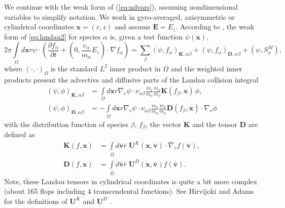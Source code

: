 \documentclass[12pt]{siamart}
\begin{document}
We continue with the weak form of (\ref{eq:ndvars}), assuming nondimensional variables to simplify notation.
We work in gyro-averaged, axisymmetric or cylindrical coordinates $\bm{x} = \left ( r, z \right )$ and assume ${\bm E = E_{z}}$.
According to \cite{Hirvijoki2016,AdamsHirvijokiKnepleyBrownIsaacMills2017}, the weak form of \ref{eq:landau2} for species $\alpha$ is, given a test function $\psi(\bm{x})$,  
\begin{equation}
\label{eq:weak-form}
2\pi \int \limits_{\Omega} d\bm{x} r \psi \cdot \left ( \frac{\partial  f_{\alpha}}{\partial t}  + \left ( 0,  \frac{ e_\alpha}{m_{\alpha}} E_z \right)  \cdot \nabla f_{\alpha}  \right)  = \sum_{\beta}\left(\psi, f_{\alpha}\right)_{\bm{K},\alpha\beta}+\left(\psi,f_{\alpha}\right)_{\mathbf{D},\alpha\beta} + \left(\psi,S^M_\alpha\right) ,
\end{equation}
where $(\cdot,\cdot)_{\Omega}$ is the standard $L^2$ inner product in $\Omega$ and the weighted inner products present the advective and diffusive parts of the Landau collision integral
\begin{align}
\label{eq:K}
\left(\psi, \phi\right)_{\bm{K},\alpha\beta}&=\int \limits_{\Omega}d\bm{x}r\nabla_{v}\psi\cdot {\nu}_{\alpha\beta}\frac{m_o}{m_{\alpha}} \frac{m_o}{m_{\beta}}\bm{K}(f_{\beta},\bm{x})\, \phi,\\
\label{eq:D}
\left(\psi,\phi\right)_{\mathbf{D},\alpha\beta}&=-\int \limits_{\Omega}d\bm{x}r\nabla_{v}\psi\cdot{\nu}_{\alpha\beta}\frac{m_o}{m_{\alpha}}\frac{m_o}{m_{\alpha}}\mathbf{D}(f_{\beta},\bm{x})\cdot\nabla_{v}\phi
\end{align}
with the distribution function of species $\beta$, $f_{\beta}$, the vector $\bm{K}$ and the tensor $\mathbf{D}$ are defined as
\begin{align}
\label{eq:fric_coef}
  \bm{K}(f,\bm{x})&=\int \limits_{\bar\Omega}d\bm{\bar{v}}\bar r\;\mathbf{U}^K(\bm{x},\bm{\bar{v}})\cdot\bar{\nabla}_{\bar{v}}f(\bm{\bar{v}}), \\
\label{eq:diff_coef}
  \mathbf{D}(f,\bm{x})&=\int
  \limits_{\bar\Omega}d\bm{\bar{v}}\bar r\;\mathbf{U}^D(\bm{x},\bm{\bar{v}})f(\bm{\bar{v}}).
\end{align}
Note, these Landau tensors in cylindrical coordinates is quite a bit more complex (about 165 flops including 4 transcendental functions).
See Hirvijoki and Adams for the definitions of $\mathbf{U}^K$ and $\mathbf{U}^D$ \cite{Hirvijoki2016}.
\end{document}
